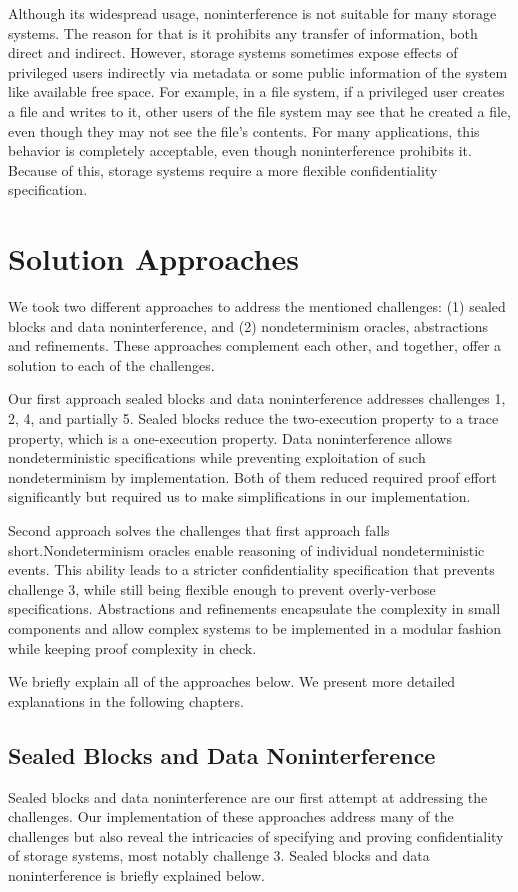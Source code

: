 Although its widespread usage, noninterference is not suitable for many storage systems. The reason for that is it prohibits any transfer of information, both direct and indirect. However, storage systems sometimes expose effects of privileged users indirectly via metadata or some public information of the system like available free space. For example, in a file system, if a privileged user creates a file and writes to it, other users of the file system may see that he created a file, even though they may not see the file's contents. For many applications, this behavior is completely acceptable, even though noninterference prohibits it. Because of this, storage systems require a more flexible confidentiality specification.

\section{Solution Approaches}
We took two different approaches to address the mentioned challenges: (1) sealed blocks and data noninterference, and (2) nondeterminism oracles, abstractions and refinements. These approaches complement each other, and together, offer a solution to each of the challenges. 

Our first approach sealed blocks and data noninterference addresses challenges 1, 2, 4, and partially 5. Sealed blocks reduce the two-execution property to a trace property, which is a one-execution property. Data noninterference allows nondeterministic specifications while preventing exploitation of such nondeterminism by implementation. Both of them reduced required proof effort significantly but required us to make simplifications in our implementation.

Second approach solves the challenges that first approach falls short.Nondeterminism oracles enable reasoning of individual nondeterministic events. This ability leads to a stricter confidentiality specification that prevents challenge 3, while still being flexible enough to prevent overly-verbose specifications. Abstractions and refinements encapsulate the complexity in small components and allow complex systems to be implemented in a modular fashion while keeping proof complexity in check. 

We briefly explain all of the approaches below. We present more detailed explanations in the following chapters.

\subsection{Sealed Blocks and Data Noninterference}
Sealed blocks and data noninterference are our first attempt at addressing the challenges. Our implementation of these approaches address many of the challenges but also reveal the intricacies of specifying and proving confidentiality of storage systems, most notably challenge 3. Sealed blocks and data noninterference is briefly explained below.

